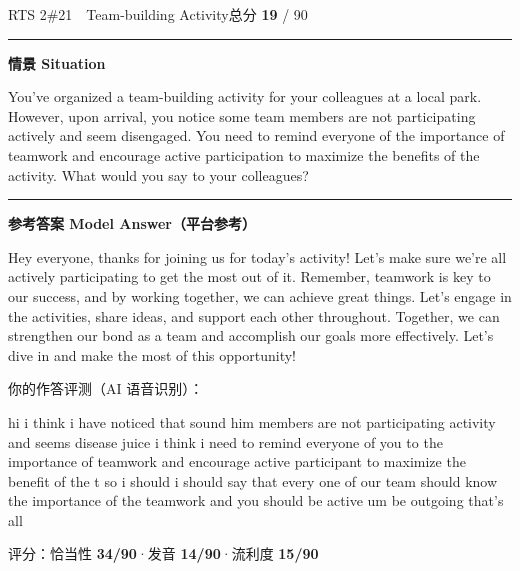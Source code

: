 \documentclass[11pt]{article}
\newcommand{\spart}[1]{\textcolor{cPartial}{\bfseries #1}} %
\newcommand{\szero}[1]{\textcolor{cWrong}{\bfseries #1}}   %
\newcommand{\ptesub}[1]{%
  \par\needspace{2\baselineskip}\smallskip
  {\color{cAccent}\rule[-0.2ex]{3pt}{1.05em}}\hspace{6pt}%
  {\bfseries\color{cHead}#1}\par\nopagebreak\smallskip}
\newcommand{\sg}[1]{\textcolor{cSpkGood}{#1}}   %
\newcommand{\sy}[1]{\textcolor{cSpkOk}{#1}}     %
\newcommand{\sr}[1]{\textcolor{cSpkBad}{#1}}    %
\begin{document}
\begin{qblock}{RTS 2\quad \#21\ \ Team-building Activity}{总分 \textcolor{cAccent}{\bfseries 19} / 90}
\ptesub{情景 Situation}
\begin{promptbox}
You've organized a team-building activity for your colleagues at a local park. However, upon arrival, you notice some team members are not participating actively and seem disengaged. You need to remind everyone of the importance of teamwork and encourage active participation to maximize the benefits of the activity. What would you say to your colleagues?
\end{promptbox}
\ptesub{参考答案 Model Answer（平台参考）}
\begin{modelbox}
Hey everyone, thanks for joining us for today's activity! Let's make sure we're all actively participating to get the most out of it. Remember, teamwork is key to our success, and by working together, we can achieve great things. Let's engage in the activities, share ideas, and support each other throughout. Together, we can strengthen our bond as a team and accomplish our goals more effectively. Let's dive in and make the most of this opportunity!
\end{modelbox}
\smallskip\par{\footnotesize\color{gray}你的作答评测（AI 语音识别）：}
\begin{asrbox}
\sg{hi} \sr{i} \sg{think i have} \sy{noticed} \sg{that sound} \sr{him} \sg{members are not} \sy{participating activity and seems} \sy{disease} \sr{juice} \sg{i think} \sr{i} \sg{need to} \sg{remind everyone} \sy{of you} \sg{to} \sy{the importance of teamwork and} \sy{encourage active participant to} \sr{maximize} \sg{the benefit of} \sy{the t} \sg{so} \sy{i should i should say that every one} \sy{of our team should} \sg{know} \sr{the} \sy{importance} \sg{of} \sy{the} \sy{teamwork and you should be active um} \sg{be outgoing that's all}
\end{asrbox}
{\small 评分：恰当性 \spart{34/90}\quad·\quad 发音 \szero{14/90}\quad·\quad 流利度 \szero{15/90}}
\end{qblock}
\end{document}
